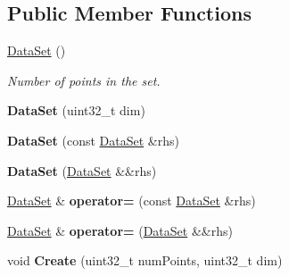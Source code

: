 \subsection*{Public Member Functions}
\begin{DoxyCompactItemize}
\item 
\hypertarget{struct_d_r_d_s_p_1_1_data_set_ac9b99505bafd5b1cccf8a361c3ac84a7}{\hyperlink{struct_d_r_d_s_p_1_1_data_set_ac9b99505bafd5b1cccf8a361c3ac84a7}{Data\-Set} ()}\label{struct_d_r_d_s_p_1_1_data_set_ac9b99505bafd5b1cccf8a361c3ac84a7}

\begin{DoxyCompactList}\small\item\em Number of points in the set. \end{DoxyCompactList}\item 
\hypertarget{struct_d_r_d_s_p_1_1_data_set_ae1212b5491e3c0a478da1910952e2bc2}{{\bfseries Data\-Set} (uint32\-\_\-t dim)}\label{struct_d_r_d_s_p_1_1_data_set_ae1212b5491e3c0a478da1910952e2bc2}

\item 
\hypertarget{struct_d_r_d_s_p_1_1_data_set_a54362d191e61148507f2fca3b4558cc3}{{\bfseries Data\-Set} (const \hyperlink{struct_d_r_d_s_p_1_1_data_set}{Data\-Set} \&rhs)}\label{struct_d_r_d_s_p_1_1_data_set_a54362d191e61148507f2fca3b4558cc3}

\item 
\hypertarget{struct_d_r_d_s_p_1_1_data_set_afb512480181cf243960cd6af9c8f07aa}{{\bfseries Data\-Set} (\hyperlink{struct_d_r_d_s_p_1_1_data_set}{Data\-Set} \&\&rhs)}\label{struct_d_r_d_s_p_1_1_data_set_afb512480181cf243960cd6af9c8f07aa}

\item 
\hypertarget{struct_d_r_d_s_p_1_1_data_set_a3cfc4b016689711854acd45637e893ef}{\hyperlink{struct_d_r_d_s_p_1_1_data_set}{Data\-Set} \& {\bfseries operator=} (const \hyperlink{struct_d_r_d_s_p_1_1_data_set}{Data\-Set} \&rhs)}\label{struct_d_r_d_s_p_1_1_data_set_a3cfc4b016689711854acd45637e893ef}

\item 
\hypertarget{struct_d_r_d_s_p_1_1_data_set_adc4d9c3292d47ee1b5ab110dd04e9166}{\hyperlink{struct_d_r_d_s_p_1_1_data_set}{Data\-Set} \& {\bfseries operator=} (\hyperlink{struct_d_r_d_s_p_1_1_data_set}{Data\-Set} \&\&rhs)}\label{struct_d_r_d_s_p_1_1_data_set_adc4d9c3292d47ee1b5ab110dd04e9166}

\item 
\hypertarget{struct_d_r_d_s_p_1_1_data_set_a714db7eb5bf512b3c1746e41da8e4859}{void {\bfseries Create} (uint32\-\_\-t num\-Points, uint32\-\_\-t dim)}\label{struct_d_r_d_s_p_1_1_data_set_a714db7eb5bf512b3c1746e41da8e4859}


\end{DoxyCompactItemize}
